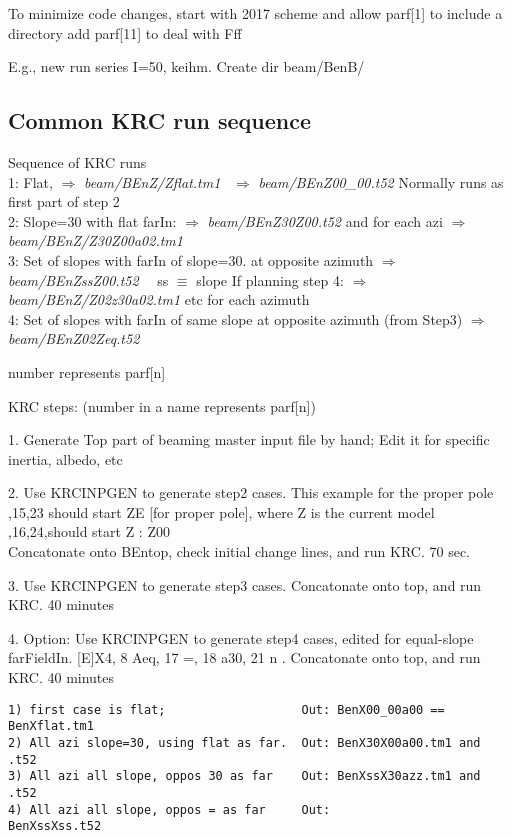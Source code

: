 \documentclass{article}
\newcommand{\qfo}[1]{$\Longrightarrow$ \textit{#1}} %
\begin{document}
To minimize code changes, start with 2017 scheme and 
\qi allow parf[1] to include a directory
\qi add parf[11] to deal with Fff

E.g., new run series I=50, keihm. Create dir beam/BenB/  

\subsection{Common KRC run sequence \label{krcseq}}
 Sequence of KRC runs
\\ 1: Flat, \qfo{beam/BEnZ/Zflat.tm1} \ \qfo{beam/BEnZ00_00.t52} 
\qi  Normally runs as first part of step 2
\\ 2: Slope=30 with flat farIn: \qfo{beam/BEnZ30Z00.t52}
\qi  and for each azi \qfo{beam/BEnZ/Z30Z00a02.tm1}
\\ 3: Set of slopes with farIn of slope=30. at opposite azimuth
\qi   \qfo{beam/BEnZssZ00.t52} \ \ ss $\equiv$ slope
\qi If planning step 4: \qfo{beam/BEnZ/Z02z30a02.tm1} etc for each azimuth
\\ 4: Set of slopes with farIn of same slope at opposite azimuth (from Step3)
\qi   \qfo{beam/BEnZ02Zeq.t52}

number represents parf[n]

KRC steps: (number in a name represents parf[n])

1. Generate Top part of beaming master input file by hand;
\qi  Edit it for specific inertia, albedo, etc

2. Use KRCINPGEN to generate step2 cases. This example for the proper pole
,15,23 should start ZE [for proper pole], where Z is the current model
,16,24,should start Z 
:  Z00 
\\ Concatonate onto BEntop, check initial change lines,  and run KRC.  70 sec.

3. Use KRCINPGEN to generate step3 cases. Concatonate onto top, and run KRC. 40 minutes 

4. Option:  Use KRCINPGEN to generate step4 cases, edited for equal-slope farFieldIn. 
 [E]X4,  8 Aeq, 17 =, 18 a30, 21 n . Concatonate onto top, and run KRC. 40 minutes 

\vspace{-3.mm} 
\begin{verbatim}
1) first case is flat;                   Out: BenX00_00a00 == BenXflat.tm1
2) All azi slope=30, using flat as far.  Out: BenX30X00a00.tm1 and .t52
3) All azi all slope, oppos 30 as far    Out: BenXssX30azz.tm1 and .t52
4) All azi all slope, oppos = as far     Out:             BenXssXss.t52
\end{verbatim}
  
\end{document}
